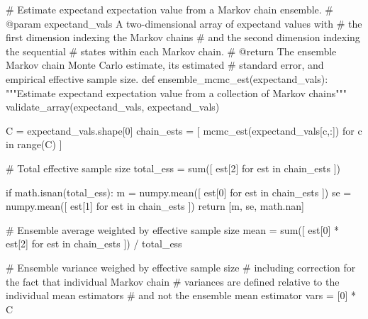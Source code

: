 \documentclass[
  letterpaper,
  DIV=11,
  numbers=noendperiod]{scrartcl}
\newenvironment{Shaded}{\begin{snugshade}}{\end{snugshade}}
\newcommand{\BuiltInTok}[1]{\textcolor[rgb]{0.00,0.23,0.31}{#1}}
\newcommand{\CommentTok}[1]{\textcolor[rgb]{0.37,0.37,0.37}{#1}}
\newcommand{\ControlFlowTok}[1]{\textcolor[rgb]{0.00,0.23,0.31}{#1}}
\newcommand{\DecValTok}[1]{\textcolor[rgb]{0.68,0.00,0.00}{#1}}
\newcommand{\KeywordTok}[1]{\textcolor[rgb]{0.00,0.23,0.31}{#1}}
\newcommand{\NormalTok}[1]{\textcolor[rgb]{0.00,0.23,0.31}{#1}}
\newcommand{\OperatorTok}[1]{\textcolor[rgb]{0.37,0.37,0.37}{#1}}
\newcommand{\StringTok}[1]{\textcolor[rgb]{0.13,0.47,0.30}{#1}}
\begin{document}
\begin{Shaded}
\begin{Highlighting}[]
\CommentTok{\# Estimate expectand expectation value from a Markov chain ensemble.}
\CommentTok{\# @param expectand\_vals A two{-}dimensional array of expectand values with}
\CommentTok{\#                       the first dimension indexing the Markov chains}
\CommentTok{\#                       and the second dimension indexing the sequential}
\CommentTok{\#                       states within each Markov chain.}
\CommentTok{\# @return The ensemble Markov chain Monte Carlo estimate, its estimated}
\CommentTok{\#         standard error, and empirical effective sample size.}
\KeywordTok{def}\NormalTok{ ensemble\_mcmc\_est(expectand\_vals):}
  \CommentTok{"""Estimate expectand expectation value from a collection of}
\CommentTok{     Markov chains"""}
\NormalTok{  validate\_array(expectand\_vals, }\StringTok{\textquotesingle{}expectand\_vals\textquotesingle{}}\NormalTok{)}
    
\NormalTok{  C }\OperatorTok{=}\NormalTok{ expectand\_vals.shape[}\DecValTok{0}\NormalTok{]}
\NormalTok{  chain\_ests }\OperatorTok{=}\NormalTok{ [ mcmc\_est(expectand\_vals[c,:]) }\ControlFlowTok{for}\NormalTok{ c }\KeywordTok{in} \BuiltInTok{range}\NormalTok{(C) ]}
  
  \CommentTok{\# Total effective sample size}
\NormalTok{  total\_ess }\OperatorTok{=} \BuiltInTok{sum}\NormalTok{([ est[}\DecValTok{2}\NormalTok{] }\ControlFlowTok{for}\NormalTok{ est }\KeywordTok{in}\NormalTok{ chain\_ests ])}
  
  \ControlFlowTok{if}\NormalTok{ math.isnan(total\_ess):}
\NormalTok{    m  }\OperatorTok{=}\NormalTok{ numpy.mean([ est[}\DecValTok{0}\NormalTok{] }\ControlFlowTok{for}\NormalTok{ est }\KeywordTok{in}\NormalTok{ chain\_ests ])}
\NormalTok{    se }\OperatorTok{=}\NormalTok{ numpy.mean([ est[}\DecValTok{1}\NormalTok{] }\ControlFlowTok{for}\NormalTok{ est }\KeywordTok{in}\NormalTok{ chain\_ests ])}
    \ControlFlowTok{return}\NormalTok{ [m, se, math.nan]}
  
  \CommentTok{\# Ensemble average weighted by effective sample size}
\NormalTok{  mean }\OperatorTok{=} \BuiltInTok{sum}\NormalTok{([ est[}\DecValTok{0}\NormalTok{] }\OperatorTok{*}\NormalTok{ est[}\DecValTok{2}\NormalTok{] }\ControlFlowTok{for}\NormalTok{ est }\KeywordTok{in}\NormalTok{ chain\_ests ]) }\OperatorTok{/}\NormalTok{ total\_ess}

  \CommentTok{\# Ensemble variance weighed by effective sample size}
  \CommentTok{\# including correction for the fact that individual Markov chain}
  \CommentTok{\# variances are defined relative to the individual mean estimators}
  \CommentTok{\# and not the ensemble mean estimator}
  \BuiltInTok{vars} \OperatorTok{=}\NormalTok{ [}\DecValTok{0}\NormalTok{] }\OperatorTok{*}\NormalTok{ C}
  

\end{Highlighting}
\end{Shaded}
\end{document}
